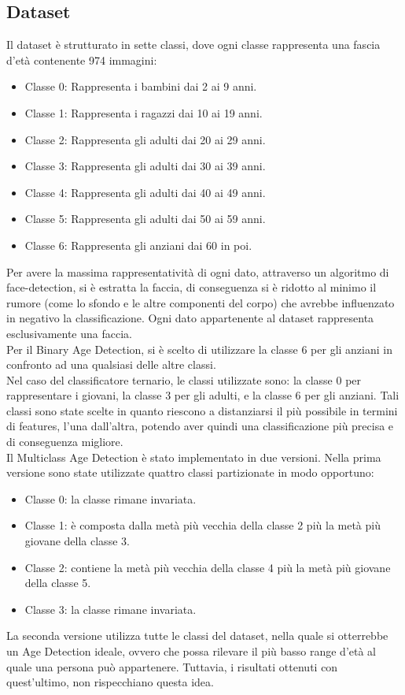 \documentclass[12pt]{IEEEtran}
\begin{document}
\subsection{Dataset}
Il dataset è strutturato in sette classi, dove ogni classe rappresenta una fascia d'età contenente 974 immagini: 
\begin{itemize}
    \item Classe 0: Rappresenta i bambini dai 2 ai 9 anni. 
    \item Classe 1: Rappresenta i ragazzi dai 10 ai 19 anni. 
    \item Classe 2: Rappresenta gli adulti dai 20 ai 29 anni.
    \item Classe 3: Rappresenta gli adulti dai 30 ai 39 anni. 
    \item Classe 4: Rappresenta gli adulti dai 40 ai 49 anni.
    \item Classe 5: Rappresenta gli adulti dai 50 ai 59 anni.
    \item Classe 6: Rappresenta gli anziani dai 60 in poi. \\
\end{itemize} 
Per avere la massima rappresentatività di ogni dato, attraverso un algoritmo di face-detection, si è estratta la faccia, di conseguenza si è ridotto al minimo il rumore (come lo sfondo e le altre componenti del corpo) che avrebbe influenzato in negativo la classificazione. Ogni dato appartenente al dataset rappresenta esclusivamente una faccia. \\
Per il Binary Age Detection, si è scelto di utilizzare la classe 6 per gli anziani in confronto ad una qualsiasi delle altre classi.\\
Nel caso del classificatore ternario, le classi utilizzate sono: la classe 0 per rappresentare i giovani, la classe 3 per gli adulti, e la classe 6 per gli anziani. 
Tali classi sono state scelte in quanto riescono a distanziarsi il più possibile in termini di features, l'una dall'altra, potendo aver quindi una classificazione più precisa e di conseguenza migliore. \\
Il Multiclass Age Detection è stato implementato in due versioni. Nella prima versione sono state utilizzate quattro classi partizionate in modo opportuno: 
\begin{itemize}
    \item Classe 0: la classe rimane invariata. 
    \item Classe 1: è composta dalla metà più vecchia della classe 2 più la metà più giovane della classe 3. 
    \item Classe 2: contiene la metà più vecchia della classe 4 più la metà più giovane della classe 5. 
    \item Classe 3: la classe rimane invariata. \\ 
\end{itemize}
\newpage
La seconda versione utilizza tutte le classi del dataset, nella quale si otterrebbe un Age Detection ideale, ovvero che possa rilevare il più basso range d'età al quale una persona può appartenere. Tuttavia, i risultati ottenuti con quest'ultimo, non rispecchiano questa idea. 
\end{document}

